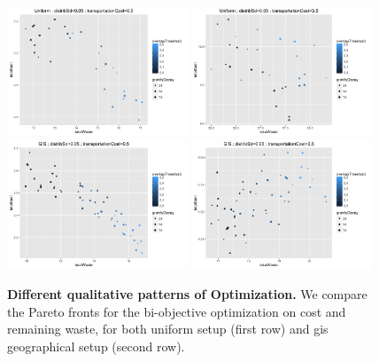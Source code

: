 \documentclass[fleqn,10pt]{wlscirep}
\begin{document}
{%
\begin{figure}
\includegraphics[width=0.48\textwidth]{figures/uniform_pareto_distribSd0_05_transportationCost0_5}
\includegraphics[width=0.48\textwidth]{figures/uniform_pareto_distribSd0_55_transportationCost3_5}\\
\includegraphics[width=0.48\textwidth]{figures/gis_pareto_distribSd0_05_transportationCost0_5}
\includegraphics[width=0.48\textwidth]{figures/gis_pareto_distribSd0_05_transportationCost3_5}
\caption{\textbf{Different qualitative patterns of Optimization.} We compare the Pareto fronts for the bi-objective optimization on cost and remaining waste, for both uniform setup (first row) and gis geographical setup (second row). }
\label{fig:pareto-regime}
\end{figure}

}
\end{document}
